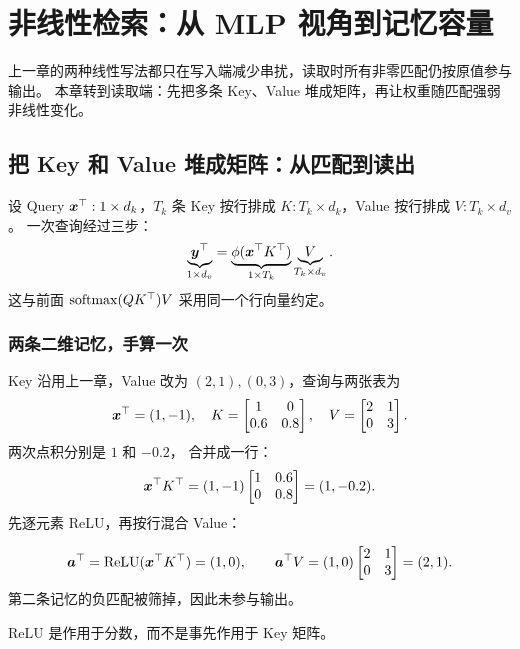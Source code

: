 \chapterrule
\section{非线性检索：从 MLP 视角到记忆容量}
\label{intro:nonlinear-memory}
\label{intro:memory-capacity}

上一章的两种线性写法都只在写入端减少串扰，读取时所有非零匹配仍按原值参与输出。
本章转到读取端：先把多条 Key、Value 堆成矩阵，再让权重随匹配强弱非线性变化。

\subsection{把 Key 和 Value 堆成矩阵：从匹配到读出}
\label{intro:stacking-key-value}
设 Query $\boldsymbol{x}^\top:1\times d_k$，$T_k$ 条 Key 按行排成
$K:T_k\times d_k$，Value 按行排成 $V:T_k\times d_v$。
一次查询经过三步：
\begin{equation}
\underbrace{\boldsymbol{y}^\top}_{1\times d_v}
=\underbrace{\phi(\boldsymbol{x}^\top K^\top)}_{1\times T_k}
\underbrace{V}_{T_k\times d_v}.
\end{equation}
这与前面 $\operatorname{softmax}(QK^\top)V$ 采用同一个行向量约定。

\subsubsection{两条二维记忆，手算一次}
Key 沿用上一章，Value 改为 $(2,1),(0,3)$，查询与两张表为
\[
\boldsymbol{x}^\top=(1,-1),\quad
K=\begin{bmatrix}1&0\\0.6&0.8\end{bmatrix},\quad
V=\begin{bmatrix}2&1\\0&3\end{bmatrix}.
\]
两次点积分别是 $1$ 和 $-0.2$，
合并成一行：
\[
\boldsymbol{x}^\top K^\top=(1,-1)\begin{bmatrix}1&0.6\\0&0.8\end{bmatrix}
=(1,-0.2).
\]
先逐元素 ReLU，再按行混合 Value：
\begin{example}
\[
\boldsymbol{a}^\top=\operatorname{ReLU}(\boldsymbol{x}^\top K^\top)=(1,0),\qquad
\boldsymbol{a}^\top V=(1,0)\begin{bmatrix}2&1\\0&3\end{bmatrix}
=(2,1).
\]
第二条记忆的负匹配被筛掉，因此未参与输出。
\end{example}
ReLU 是作用于分数，而不是事先作用于 Key 矩阵。

